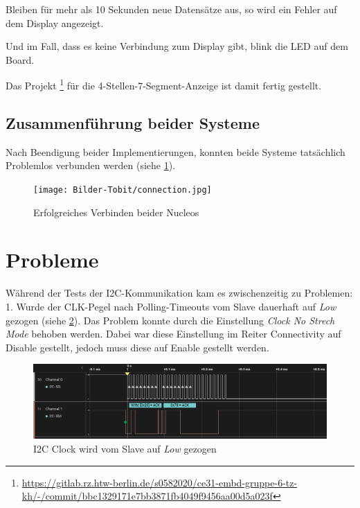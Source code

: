 \documentclass[11pt,a4paper,titlepage]{article}
\begin{document}
Bleiben für mehr als 10 Sekunden neue Datensätze aus, so wird ein Fehler auf dem Display angezeigt.

Und im Fall, dass es keine Verbindung zum Display gibt, blink die LED auf dem Board.

Das Projekt
\footnote{\url{https://gitlab.rz.htw-berlin.de/s0582020/ce31-embd-gruppe-6-tz-kh/-/commit/bbc1329171e7bb3871fb4049f9456aa00d5a023f}}
für die 4-Stellen-7-Segment-Anzeige ist damit fertig gestellt.

\subsection{Zusammenführung beider Systeme}
Nach Beendigung beider Implementierungen, konnten beide Systeme tatsächlich Problemlos verbunden werden (siehe \cref{fig:success}).

\begin{figure}[H]
    \begin{center}
        \texttt{[image: Bilder-Tobit/connection.jpg]}
        \caption{Erfolgreiches Verbinden beider Nucleos}
        \label{fig:success}
    \end{center}
\end{figure}


\newpage

\section{Probleme}

Während der Tests der I2C-Kommunikation kam es zwischenzeitig zu Problemen:
1. Wurde der CLK-Pegel nach Polling-Timeouts vom Slave dauerhaft auf \textit{Low} gezogen (siehe \cref{fig:clk_low}).
Das Problem konnte durch die Einstellung \textit{Clock No Strech Mode} behoben werden.
Dabei war diese Einstellung im Reiter Connectivity auf Disable gestellt, jedoch muss diese auf Enable gestellt werden.\\

\begin{figure}[H]
    \begin{center}
        \includegraphics[width=\textwidth]{Bilder-Tobit/i2c-problem_clk-low_2.png}
        \caption{I2C Clock wird vom Slave auf \textit{Low} gezogen}
        \label{fig:clk_low}
    \end{center}
\end{figure}
\end{document}
